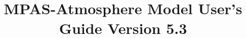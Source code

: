 \documentclass[11pt]{report}
\newcommand{\version}{5.3}
\begin{document}
\title{\bf \hfil MPAS-Atmosphere Model User's Guide \hfil \break \hfil \break Version \version}


\maketitle



\tableofcontents










\appendix






\end{document}
